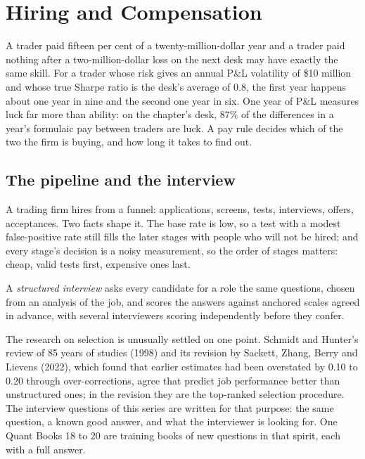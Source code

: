 \chapter{Hiring and Compensation}\label{ch:fm:hiring-and-compensation}

A trader paid fifteen per cent of a twenty-million-dollar year and a trader paid nothing after a two-million-dollar loss on the next desk may have
exactly the same skill. For a trader whose risk gives an annual P\&L volatility of \$10 million and whose true Sharpe ratio is the desk's
average of 0.8, the first year happens about one year in nine and the second one year in six. One year of P\&L measures luck far more than ability: on
the chapter's desk, 87\% of the differences in a year's formulaic pay between traders are luck. A pay rule decides which of the two the firm is
buying, and how long it takes to find out.

\section{The pipeline and the interview}

A trading firm hires from a funnel: applications, screens, tests, interviews, offers, acceptances. Two facts shape it. The base rate is low, so a
test with a modest false-positive rate still fills the later stages with people who will not be hired; and every stage's decision is a noisy
measurement, so the order of stages matters: cheap, valid tests first, expensive ones last.

\begin{definition}\label{def:fm:hiring-and-compensation:structured}
A \emph{structured interview} asks every candidate for a role the same questions, chosen from an analysis of the job,
and scores the answers against anchored scales agreed in advance, with several interviewers scoring independently before they confer.
\end{definition}

The research on selection is unusually settled on one point. Schmidt and Hunter's review of 85 years of studies (1998) and its revision by
Sackett, Zhang, Berry and Lievens (2022), which found that earlier estimates had been overstated by 0.10 to 0.20 through over-corrections, agree
that  predict job performance better than unstructured ones; in the revision they are the top-ranked selection procedure.
The interview questions of this series are written for that purpose: the same question, a known good answer, and what the interviewer is looking
for. One Quant Books 18 to 20 are training books of new questions in that spirit, each with a full answer.

